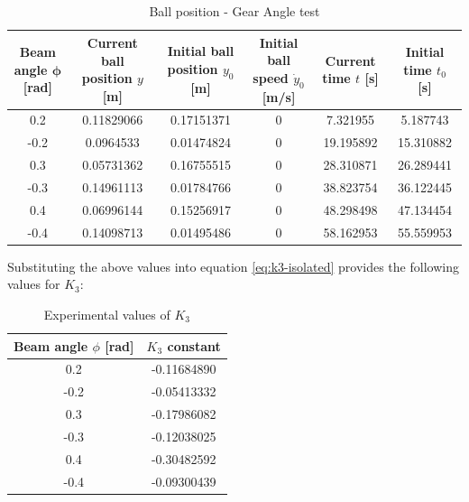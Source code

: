 \documentclass[11pt, letterpaper]{article}
\begin{document}
\begin{table}[htbp]
    \centering
    \small
    \setlength{\tabcolsep}{3pt}
    \caption{Ball position - Gear Angle test}
    \label{tab:acceleration-test}
    \begin{tabular}{cccccc}
        \toprule
        \shortstack{\textbf{Beam angle}                            \\$\boldsymbol{\phi}$ \textbf{[rad]}} &
        \shortstack{\textbf{Current ball}                          \\\textbf{position} $y$ \textbf{[m]}} &
        \shortstack{\textbf{Initial ball}                          \\\textbf{position} $y_0$ \textbf{[m]}} &
        \shortstack{\textbf{Initial ball speed}                    \\$\dot{y}_0$ \textbf{[m/s]}} &
        \shortstack{\textbf{Current time}                          \\$t$ \textbf{[s]}} &
        \shortstack{\textbf{Initial time}                          \\$t_0$ \textbf{[s]}} \\
        \midrule
        0.2  & 0.11829066 & 0.17151371 & 0 & 7.321955  & 5.187743  \\
        -0.2 & 0.0964533  & 0.01474824 & 0 & 19.195892 & 15.310882 \\
        0.3  & 0.05731362 & 0.16755515 & 0 & 28.310871 & 26.289441 \\
        -0.3 & 0.14961113 & 0.01784766 & 0 & 38.823754 & 36.122445 \\
        0.4  & 0.06996144 & 0.15256917 & 0 & 48.298498 & 47.134454 \\
        -0.4 & 0.14098713 & 0.01495486 & 0 & 58.162953 & 55.559953 \\

        \bottomrule
    \end{tabular}
\end{table}

Substituting the above values into equation \ref{eq:k3-isolated} provides the following values for
$K_3$:

\begin{table}[htbp]
    \centering
    \caption{Experimental values of $K_3$}
    \label{tab:k3-results}
    \begin{tabular}{cc}
        \toprule
        \textbf{Beam angle $\phi$ [rad]} & \textbf{$K_3$ constant} \\
        \midrule
        0.2                              & -0.11684890             \\
        -0.2                             & -0.05413332             \\
        0.3                              & -0.17986082             \\
        -0.3                             & -0.12038025             \\
        0.4                              & -0.30482592             \\
        -0.4                             & -0.09300439             \\
        \bottomrule
    \end{tabular}
\end{table}
\end{document}
